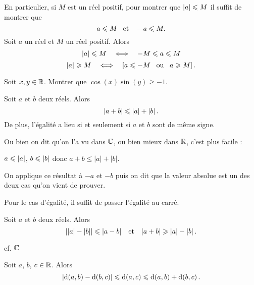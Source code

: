 \documentclass{magnolia}
\begin{document}
\begin{remarques}
\remarque En particulier, si $M$ est un réel positif, pour montrer que
  $\left|a\right|\leqslant M$ il suffit de montrer que
  \[a\leqslant M \quad\!\text{et}\quad\! -a\leqslant M.\] 
\remarque Soit $a$ un réel et $M$ un réel positif. Alors
  \[\left|a\right|\leqslant M \quad\Longleftrightarrow\quad -M\leqslant a\leqslant M\]
  \[\left|a\right|\geqslant M \quad\Longleftrightarrow\quad \left[a\leqslant -M \quad\!\text{ou}\quad\! a\geqslant M\right].\]
\end{remarques}

\begin{exoUnique}
\exo Soit $x,y\in\mathbb{R}$. Montrer que $\cos(x)\sin(y)\geq -1$.  
\end{exoUnique}

\begin{proposition}
Soit $a$ et $b$ deux réels. Alors
\[\left|a+b\right|\leqslant \left|a\right|+\left|b\right|.\]
De plus, l'égalité a lieu si et seulement si $a$ et $b$ sont de même signe.  
\end{proposition}

\begin{preuve}
Ou bien on dit qu'on l'a vu dans $\mathbb{C}$, ou bien mieux dans $\mathbb{R}$, c'est plus facile :

$a\leqslant \left|a\right|$, $b\leqslant\left|b\right|$ donc $a+b\leq |a|+|b|$.

On applique ce résultat à $-a$ et $-b$ puis on dit que la valeur absolue est un des deux cas qu'on vient de prouver. 

Pour le cas d'égalité, il suffit de passer l'égalité au carré.
\end{preuve}

\begin{proposition}
Soit $a$ et $b$ deux réels. Alors
\[\left|\left|a\right|-\left|b\right|\right|\leqslant\left|a-b\right| \quad\!\text{et}\quad\! \left|a+b\right|\geqslant \left|a\right|-\left|b\right|.\]
\end{proposition}

\begin{preuve}
cf. $\mathbb{C}$
\end{preuve}

\begin{remarqueUnique}
\remarque Soit $a$, $b$, $c\in\mathbb{R}$. Alors
  \[\left|{\rm d}\!\left(a,b\right)-{\rm d}\!\left(b,c\right)\right| \leqslant {\rm d}\!\left(a,c\right) \leqslant
    {\rm d}\!\left(a,b\right)+{\rm d}\!\left(b,c\right).\]
\end{remarqueUnique}
\end{document}
